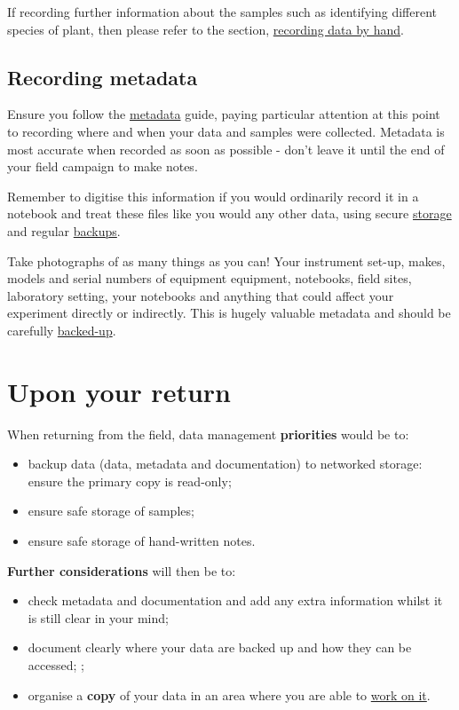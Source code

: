 \documentclass[12pt,a4paper,oneside]{report}
\providecommand{\tightlist}{%
  \setlength{\itemsep}{0pt}\setlength{\parskip}{0pt}}
\begin{document}
If recording further information about the samples such as identifying
different species of plant, then please refer to the section,
\protect\hyperlink{recording-data-by-hand}{recording data by hand}.

\hypertarget{recording-metadata}{%
\section{Recording metadata}\label{recording-metadata}}

Ensure you follow the \protect\hyperlink{metadata}{metadata} guide,
paying particular attention at this point to recording where and when
your data and samples were collected. Metadata is most accurate when
recorded as soon as possible - don't leave it until the end of your
field campaign to make notes.

Remember to digitise this information if you would ordinarily record it
in a notebook and treat these files like you would any other data, using
secure \protect\hyperlink{storing-data}{storage} and regular
\protect\hyperlink{backing-up-data}{backups}.

Take photographs of as many things as you can! Your instrument set-up,
makes, models and serial numbers of equipment equipment, notebooks,
field sites, laboratory setting, your notebooks and anything that could
affect your experiment directly or indirectly. This is hugely valuable
metadata and should be carefully
\protect\hyperlink{backing-up-data}{backed-up}.

\hypertarget{upon-your-return}{%
\chapter{Upon your return}\label{upon-your-return}}

When returning from the field, data management \textbf{priorities} would
be to:

\begin{itemize}
\tightlist
\item
  backup data (data, metadata and documentation) to networked storage:
  ensure the primary copy is read-only;
\item
  ensure safe storage of samples;
\item
  ensure safe storage of hand-written notes.
\end{itemize}

\textbf{Further considerations} will then be to:

\begin{itemize}
\tightlist
\item
  check metadata and documentation and add any extra information whilst
  it is still clear in your mind;
\item
  document clearly where your data are backed up and how they can be
  accessed; ;
\item
  organise a \textbf{copy} of your data in an area where you are able to
  \protect\hyperlink{working-on-your-data}{work on it}.
\end{itemize}
\end{document}
